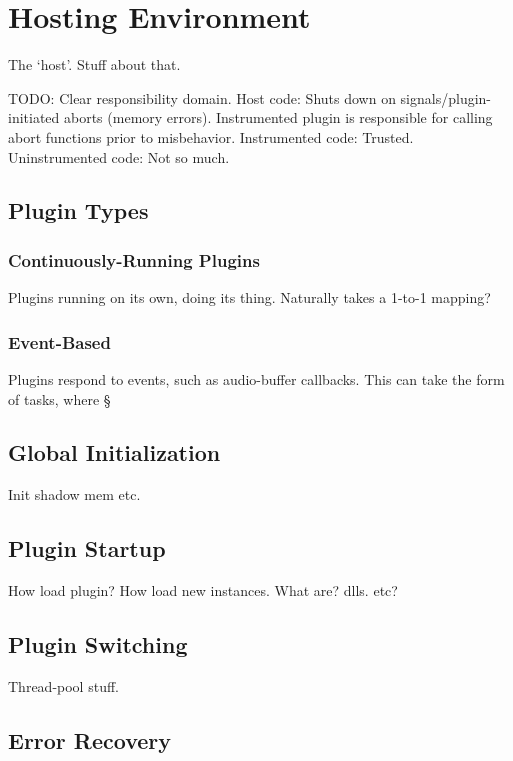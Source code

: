 \chapter {Hosting Environment}

The `host'. Stuff about that.

TODO: Clear responsibility domain. Host code: Shuts down on
      signals/plugin-initiated aborts (memory errors). Instrumented plugin is
      responsible for calling abort functions prior to misbehavior. Instrumented
      code: Trusted. Uninstrumented code: Not so much.


\section {Plugin Types}

\subsection {Continuously-Running Plugins}

Plugins running on its own, doing its thing. Naturally takes a 1-to-1 mapping?

\subsection {Event-Based}

Plugins respond to events, such as audio-buffer callbacks. This can take the
form of tasks, where §


\section {Global Initialization}

Init shadow mem etc.


\section {Plugin Startup}

How load plugin? How load new instances. What are? dlls. etc?


\section {Plugin Switching}

Thread-pool stuff.


\section {Error Recovery}

